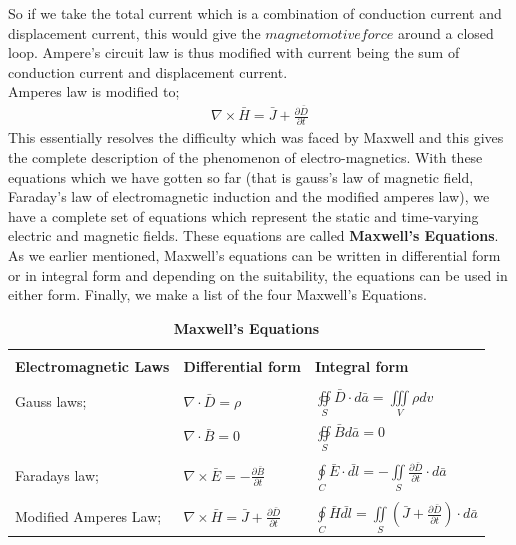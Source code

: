 So if we take the total current which is a combination of conduction current and displacement current, this would give the $magnetomotive force$ around a closed loop.
Ampere's circuit law is thus modified with current being the sum of conduction current and displacement current.\\
Amperes law is modified to;
\begin{align}
\nabla\times\bar{H}=\bar{J}+\frac{\partial\bar{D}}{\partial t}
\end{align}
This essentially resolves the difficulty which was faced by Maxwell and this gives the complete description of the phenomenon of electro-magnetics. With these equations which we have gotten so far (that is gauss's law of magnetic field, Faraday's law of electromagnetic induction and the modified amperes law), we have a complete set of equations which represent the static and time-varying electric and magnetic fields. These equations are called \textbf{Maxwell's Equations}. As we earlier mentioned, Maxwell's equations can be written in differential form or in integral form and depending on the suitability, the equations can be used in either form. Finally, we make a list of the four Maxwell's Equations.
\begin{table}[h]
\caption{\textbf{Maxwell's Equations}}
\centering
\begin{tabular}{p{3cm} p{2cm} p{2cm}}
\hline \\
\textbf{Electromagnetic Laws} & \textbf{Differential form} & \textbf{Integral form} \\ [0.5ex]
\hline \\
Gauss laws; & $\nabla\cdot\bar{D}=\rho$ & $\oiint\limits_S\bar{D}\cdot d\bar{a}=\iiint\limits_V
\rho dv$\\
& $\nabla\cdot\bar{B}=0$ & $\oiint\limits_S\bar{B}d\bar{a}=0$\\
\hline \\

Faradays law; & $\nabla\times\bar{E}=-\frac{\partial\bar{B}}{\partial t}$ & $\oint\limits_C\bar{E}\cdot\bar{dl}=-\iint\limits_S\frac{\partial\bar{D}}{\partial t}\cdot d\bar{a}$ \\
\hline \\
Modified Amperes Law; &
$\nabla\times\bar{H}=\bar{J}+\frac{\partial\bar{D}}{\partial t}$ & $\oint\limits_C\bar{H}\bar{dl}=\iint\limits_S(\bar{J}+\frac{\partial\bar{D}}{\partial t})\cdot d\bar{a}$ \\
\hline
\end{tabular}
\end{table}

